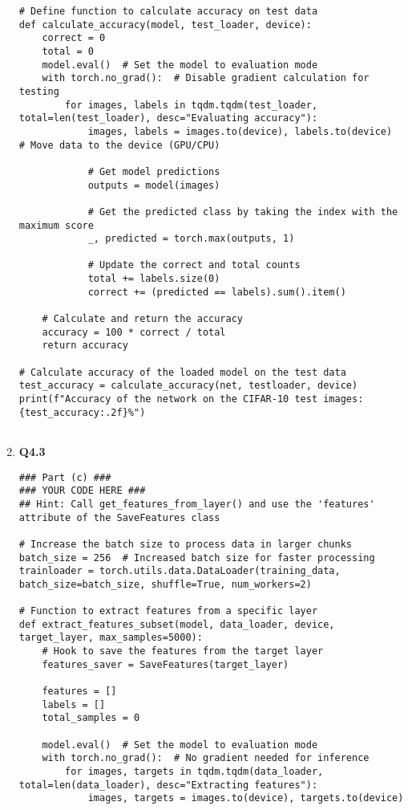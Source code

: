 \documentclass{article}
\begin{document}
\begin{enumerate}
\begin{verbatim}
# Define function to calculate accuracy on test data
def calculate_accuracy(model, test_loader, device):
    correct = 0
    total = 0
    model.eval()  # Set the model to evaluation mode
    with torch.no_grad():  # Disable gradient calculation for testing
        for images, labels in tqdm.tqdm(test_loader, total=len(test_loader), desc="Evaluating accuracy"):
            images, labels = images.to(device), labels.to(device)  # Move data to the device (GPU/CPU)
            
            # Get model predictions
            outputs = model(images)
            
            # Get the predicted class by taking the index with the maximum score
            _, predicted = torch.max(outputs, 1)
            
            # Update the correct and total counts
            total += labels.size(0)
            correct += (predicted == labels).sum().item()
    
    # Calculate and return the accuracy
    accuracy = 100 * correct / total
    return accuracy

# Calculate accuracy of the loaded model on the test data
test_accuracy = calculate_accuracy(net, testloader, device)
print(f"Accuracy of the network on the CIFAR-10 test images: {test_accuracy:.2f}%")
    
    \end{verbatim}\newpage
    
    
    
    
    \item 
    \textbf{Q4.3}
    \begin{verbatim}
### Part (c) ###
### YOUR CODE HERE ###
## Hint: Call get_features_from_layer() and use the 'features' attribute of the SaveFeatures class

# Increase the batch size to process data in larger chunks
batch_size = 256  # Increased batch size for faster processing
trainloader = torch.utils.data.DataLoader(training_data, batch_size=batch_size, shuffle=True, num_workers=2)

# Function to extract features from a specific layer
def extract_features_subset(model, data_loader, device, target_layer, max_samples=5000):
    # Hook to save the features from the target layer
    features_saver = SaveFeatures(target_layer)
    
    features = []
    labels = []
    total_samples = 0
    
    model.eval()  # Set the model to evaluation mode
    with torch.no_grad():  # No gradient needed for inference
        for images, targets in tqdm.tqdm(data_loader, total=len(data_loader), desc="Extracting features"):
            images, targets = images.to(device), targets.to(device)
            

\end{verbatim}
\end{enumerate}
\end{document}
